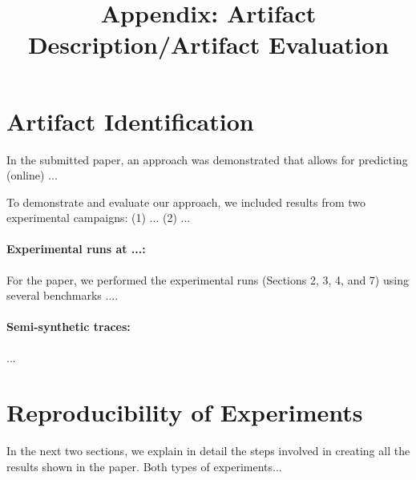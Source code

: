 \documentclass[sigconf,nonacm=true]{acmart}
\title[FTIO: Detecting I/O Periodicity Using Frequency Techniques]{Appendix: Artifact Description/Artifact Evaluation}
\begin{document}
\acmPrice{}
\acmDOI{}
\acmISBN{}

\sloppy
\maketitle


\renewcommand{\shortauthors}{ Tarraf, et al. }

\section*{Artifact Identification}
In the submitted paper, an approach was demonstrated 
that allows for predicting (online) ...

To demonstrate and evaluate our approach, we included results from two experimental campaigns:
(1) ...
(2) ...

\paragraph{Experimental runs at ...:} 
For the paper, we performed the experimental runs (Sections 2, 3, 4, and 7) using several benchmarks ....

\paragraph{Semi-synthetic traces:} 
...

\section*{Reproducibility of Experiments}
In the next two sections, we explain in detail the steps involved in creating all the results shown in the paper. 
Both types of experiments...
\end{document}
